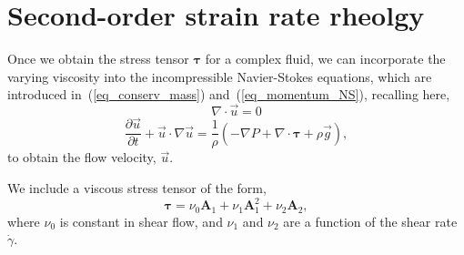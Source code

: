 \section{Second-order strain rate rheolgy}
Once we obtain the stress tensor $\bm{\tau}$ for a complex fluid, we can incorporate the varying viscosity into the incompressible Navier-Stokes equations, which are introduced in~(\ref{eq_conserv_mass}) and~(\ref{eq_momentum_NS}), recalling here,
\begin{equation*}
  \nabla \cdot \vec{u} = 0 
  \nonumber
\end{equation*}
\begin{equation*}
  \frac{\partial \vec{u}}{\partial t} + \vec{u}\cdot \nabla \vec{u}
  = \frac{1}{\rho}
  \left(
  - \nabla P 
      + \nabla \cdot   \bm{\tau} 
      +  \rho  \vec{g} 
      \right),
      \nonumber
\end{equation*}
to obtain the flow velocity, $\vec{u}$.

We include a viscous stress tensor of the form,
\begin{equation}
   \boldsymbol{\tau} = 
    \nu_0  \bm{A}_1 +  \nu_1  \bm{A}_1^2 + \nu_2 \bm{A}_2,
   \label{eq_CN_tau}
\end{equation}
where $\nu_0$ is constant in shear flow, and $\nu_1$ and $\nu_2$ are a function of the shear rate $\dot{\gamma}$.
